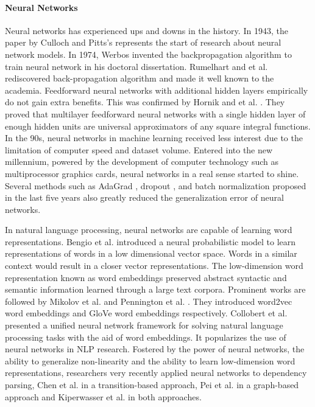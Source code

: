 \paragraph*{Neural Networks}
Neural networks has experienced ups and downs in the history. In 1943, the paper by Culloch and Pitts's \cite{mcculloch1943logical} represents the start of research about neural network models. In 1974, Werbos \cite{werbos1974} invented the backpropagation algorithm to train neural network in his doctoral dissertation. Rumelhart and et al. \cite{rumelhart1986} rediscovered back-propagation algorithm and made it well known to the academia. Feedforward neural networks with additional hidden layers empirically do not gain extra benefits. This was confirmed by Hornik and et al. \cite{hornik1989}. They proved that multilayer feedforward neural networks with a single hidden layer of enough hidden units are universal approximators of any square integral functions. In the 90s, neural networks in machine learning received less interest due to the limitation of computer speed and dataset volume. Entered into the new millennium, powered by the development of computer technology such as multiprocessor graphics cards, neural networks in a real sense started to shine. Several methods such as AdaGrad \cite{adagrad}, dropout \cite{dropout}, and batch normalization \cite{ioffe2015batch} proposed in the last five years also greatly reduced the generalization error of neural networks. 

 In natural language processing, neural networks are capable of learning word representations. Bengio et al. \cite{bengio2003neural} introduced a neural probabilistic model to learn representations of words in a low dimensional vector space. Words in a similar context would result in a closer vector representations. The low-dimension word representation known as word embeddings preserved abstract syntactic and semantic information learned through a large text corpora. Prominent works are followed by Mikolov et al. \cite{word2vec} and Pennington et al. \cite{glove}. They introduced word2vec word embeddings and GloVe word embeddings respectively. Collobert et al. \cite{collobert2011natural} presented a unified neural network framework for solving natural language processing tasks with the aid of word embeddings. It popularizes the use of neural networks in NLP research. Fostered by the power of neural networks, the ability to generalize non-linearity and the ability to learn low-dimension word representations, researchers very recently applied neural networks to dependency parsing, Chen et al. \cite{chen2014fast} in a transition-based approach, Pei et al. \cite{pei2015} in a graph-based approach and Kiperwasser et al. \cite{kiperwasser2016simple} in both approaches. 


